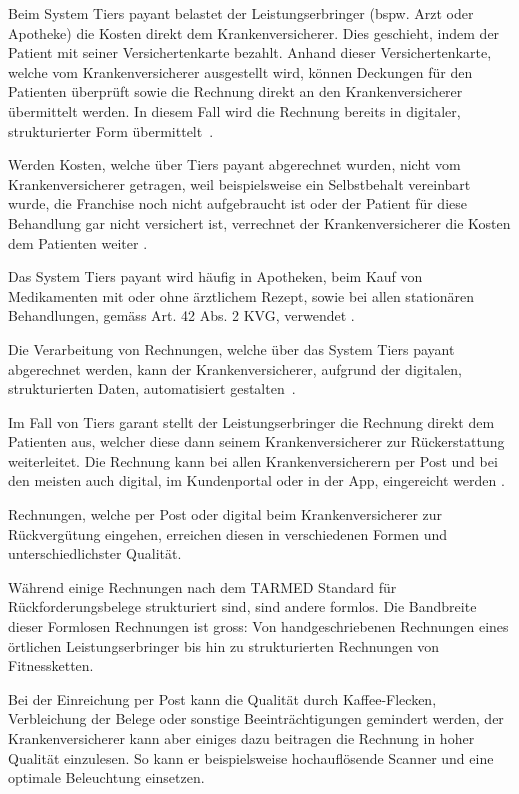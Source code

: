 Beim System Tiers payant belastet der Leistungserbringer (bspw. Arzt oder Apotheke) die Kosten direkt dem Krankenversicherer. Dies geschieht, indem der Patient mit seiner Versichertenkarte bezahlt. Anhand dieser Versichertenkarte, welche vom Krankenversicherer ausgestellt wird, können Deckungen für den Patienten überprüft sowie die Rechnung direkt an den Krankenversicherer übermittelt werden. In diesem Fall wird die Rechnung bereits in digitaler, strukturierter Form übermittelt~\autocite{EDI2017}. 

Werden Kosten, welche über Tiers payant abgerechnet wurden, nicht vom Krankenversicherer getragen, weil beispielsweise ein Selbstbehalt vereinbart wurde, die Franchise noch nicht aufgebraucht ist oder der Patient für diese Behandlung gar nicht versichert ist, verrechnet der Krankenversicherer die Kosten dem Patienten weiter \autocite{EDI2017}.

Das System Tiers payant wird häufig in Apotheken, beim Kauf von Medikamenten mit oder ohne ärztlichem Rezept, sowie bei allen stationären Behandlungen, gemäss Art. 42 Abs. 2 KVG, verwendet \autocite{EDI2017}.

Die Verarbeitung von Rechnungen, welche über das System Tiers payant abgerechnet werden, kann der Krankenversicherer, aufgrund der digitalen, strukturierten Daten, automatisiert gestalten~\autocite{BAG2016}.

Im Fall von Tiers garant stellt der Leistungserbringer die Rechnung direkt dem Patienten aus, welcher diese dann seinem Krankenversicherer zur Rückerstattung weiterleitet. Die Rechnung kann bei allen Krankenversicherern per Post und bei den meisten auch digital, im Kundenportal oder in der App, eingereicht werden \autocite{EDI2017}.

Rechnungen, welche per Post oder digital beim Krankenversicherer zur Rückvergütung eingehen, erreichen diesen in verschiedenen Formen und unterschiedlichster Qualität. 

Während einige Rechnungen nach dem TARMED Standard für Rückforderungsbelege strukturiert sind, sind andere formlos. Die Bandbreite dieser Formlosen Rechnungen ist gross: Von handgeschriebenen Rechnungen eines örtlichen Leistungserbringer bis hin zu strukturierten Rechnungen von Fitnessketten.

Bei der Einreichung per Post kann die Qualität durch Kaffee-Flecken, Verbleichung der Belege oder sonstige Beeinträchtigungen gemindert werden, der Krankenversicherer kann aber einiges dazu beitragen die Rechnung in hoher Qualität einzulesen. So kann er beispielsweise hochauflösende Scanner und eine optimale Beleuchtung einsetzen.


